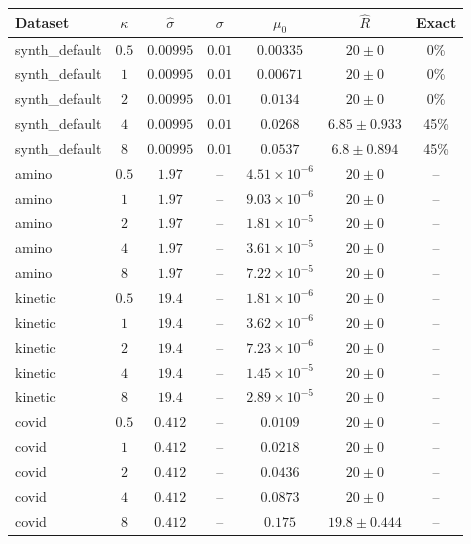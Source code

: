 \begin{longtable}{@{}lcccccc@{}}
\toprule
Dataset & \(\kappa\) & \(\hat\sigma\) & \(\sigma\) & \(\mu_0\) & \(\hat R\) & Exact \\
\midrule
\endhead
synth\_default & \(0.5\) & \(0.00995\) & \(0.01\) & \(0.00335\) & \(20 \pm 0\) & 0\% \\
synth\_default & \(1\) & \(0.00995\) & \(0.01\) & \(0.00671\) & \(20 \pm 0\) & 0\% \\
synth\_default & \(2\) & \(0.00995\) & \(0.01\) & \(0.0134\) & \(20 \pm 0\) & 0\% \\
synth\_default & \(4\) & \(0.00995\) & \(0.01\) & \(0.0268\) & \(6.85 \pm 0.933\) & 45\% \\
synth\_default & \(8\) & \(0.00995\) & \(0.01\) & \(0.0537\) & \(6.8 \pm 0.894\) & 45\% \\
amino & \(0.5\) & \(1.97\) & -- & \(4.51{\times}10^{-6}\) & \(20 \pm 0\) & -- \\
amino & \(1\) & \(1.97\) & -- & \(9.03{\times}10^{-6}\) & \(20 \pm 0\) & -- \\
amino & \(2\) & \(1.97\) & -- & \(1.81{\times}10^{-5}\) & \(20 \pm 0\) & -- \\
amino & \(4\) & \(1.97\) & -- & \(3.61{\times}10^{-5}\) & \(20 \pm 0\) & -- \\
amino & \(8\) & \(1.97\) & -- & \(7.22{\times}10^{-5}\) & \(20 \pm 0\) & -- \\
kinetic & \(0.5\) & \(19.4\) & -- & \(1.81{\times}10^{-6}\) & \(20 \pm 0\) & -- \\
kinetic & \(1\) & \(19.4\) & -- & \(3.62{\times}10^{-6}\) & \(20 \pm 0\) & -- \\
kinetic & \(2\) & \(19.4\) & -- & \(7.23{\times}10^{-6}\) & \(20 \pm 0\) & -- \\
kinetic & \(4\) & \(19.4\) & -- & \(1.45{\times}10^{-5}\) & \(20 \pm 0\) & -- \\
kinetic & \(8\) & \(19.4\) & -- & \(2.89{\times}10^{-5}\) & \(20 \pm 0\) & -- \\
covid & \(0.5\) & \(0.412\) & -- & \(0.0109\) & \(20 \pm 0\) & -- \\
covid & \(1\) & \(0.412\) & -- & \(0.0218\) & \(20 \pm 0\) & -- \\
covid & \(2\) & \(0.412\) & -- & \(0.0436\) & \(20 \pm 0\) & -- \\
covid & \(4\) & \(0.412\) & -- & \(0.0873\) & \(20 \pm 0\) & -- \\
covid & \(8\) & \(0.412\) & -- & \(0.175\) & \(19.8 \pm 0.444\) & -- \\

\end{longtable}
